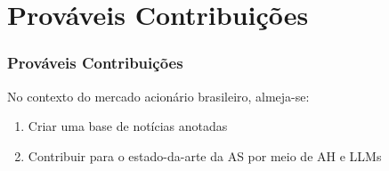 \section{Prováveis Contribuições} %


\begin{frame}
	\frametitle{Prováveis Contribuições}
    No contexto do mercado acionário brasileiro, almeja-se:
    \begin{enumerate}
        \item Criar uma base de notícias anotadas
        \item Contribuir para o estado-da-arte da AS por meio de AH e LLMs
    \end{enumerate}
	
\end{frame}


